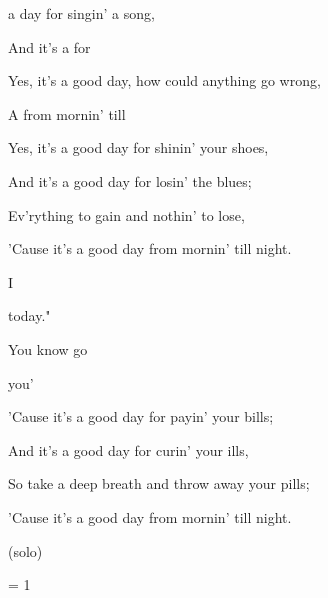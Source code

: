 
\zs
{} a  day for singin' a song,

And it's a  for  

Yes, it's a good day, how could anything go wrong, 

A  from mornin' till 
\ks

\zs 
Yes, it's a good day for shinin' your shoes, 

And it's a good day for losin' the blues; 

Ev'rything to gain and nothin' to lose, 

'Cause it's a good day from mornin' till night. 
\ks

\zr
I    

 today." 

You know  go   


 you'  
\kr

\zs
'Cause it's a good day for payin' your bills; 

And it's a good day for curin' your ills, 

So take a deep breath and throw away your pills; 

'Cause it's a good day from mornin' till night. 
\ks

(solo)

\zr
\kr

\zs
= 1
\ks

\kp
